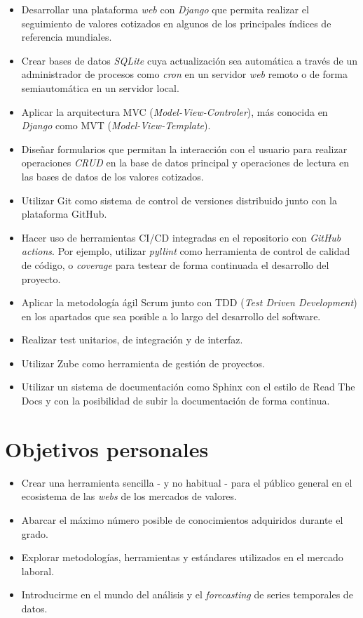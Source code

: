 \begin{itemize}
\tightlist
\item
Desarrollar una plataforma \emph{web} con \emph{Django} que permita
 realizar el seguimiento de valores cotizados en algunos de los principales
 índices de referencia mundiales. 
\item
Crear bases de datos \emph{SQLite} cuya actualización sea automática a través
 de un administrador de procesos como \emph{cron} en un servidor \emph{web} remoto
 o de forma semiautomática en un servidor local. 
\item
Aplicar la arquitectura MVC (\emph{Model-View-Controler}), más conocida en
 \emph{Django} como MVT (\emph{Model-View-Template}).
\item
Diseñar formularios que permitan la interacción con el usuario para realizar 
 operaciones \emph{CRUD} en la base de datos principal y operaciones de
 lectura en las bases de datos de los valores cotizados. 
\item
Utilizar Git como sistema de control de versiones distribuido junto
 con la plataforma GitHub.
\item
Hacer uso de herramientas CI/CD integradas en el repositorio con
 \emph{GitHub actions}. Por ejemplo, utilizar \emph{pyllint} como
 herramienta de control de calidad de código, o \emph{coverage}
 para testear de forma continuada el desarrollo del proyecto. 
\item
Aplicar la metodología ágil Scrum junto con TDD (\emph{Test Driven
 Development}) en los apartados que sea posible a lo largo del desarrollo
 del software. 
\item
Realizar test unitarios, de integración y de interfaz.
\item
Utilizar Zube como herramienta de gestión de proyectos.
\item
Utilizar un sistema de documentación como Sphinx con el estilo de Read The Docs
 y con la posibilidad de subir la documentación de forma continua. 
\end{itemize}

\section{Objetivos personales}\label{objetivos-personales}

\begin{itemize}
\tightlist
\item
Crear una herramienta sencilla - y no habitual - para el público general en el 
 ecosistema de las \emph{webs} de los mercados de valores. 
\item  
Abarcar el máximo número posible de conocimientos adquiridos durante el grado.
\item
Explorar metodologías, herramientas y estándares utilizados en el mercado 
 laboral.
\item
Introducirme en el mundo del análisis y el \emph{forecasting} de series
 temporales de datos. 
\end{itemize}
